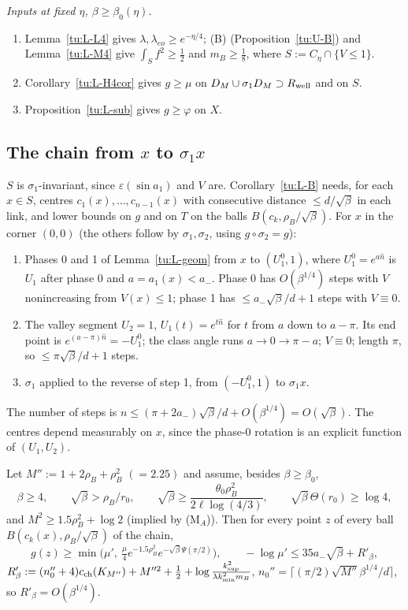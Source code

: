 \noindent\emph{Inputs at fixed $\eta$, $\beta\ge\beta_0(\eta)$.}
\begin{enumerate}
\item Lemma~\ref{tu:L-L4} gives $\lambda,\lambda_{eo}\ge e^{-\eta/4}$; (B) (Proposition~\ref{tu:U-B}) and Lemma~\ref{tu:L-M4} give
$\int_Sf^2\ge\frac12$ and $m_B\ge\frac18$, where $S:=C_\eta\cap\{V\le1\}$.
\item Corollary~\ref{tu:L-H4cor} gives $g\ge\mu$ on $D_M\cup\sigma_1D_M\supset R_{\rm well}$ and on $S$.
\item Proposition~\ref{tu:L-sub} gives $g\ge\varphi$ on $X$.
\end{enumerate}

\subsection{The chain from $x$ to $\sigma_1x$}\label{tu:L-chainsec}
$S$ is $\sigma_1$-invariant, since $\varepsilon(\sin a_1)$ and $V$ are. Corollary~\ref{tu:L-B} needs, for each $x\in S$, centres
$c_1(x),\dots,c_{n-1}(x)$ with consecutive distance $\le d/\sqrt\beta$ in each link, and lower bounds on $g$ and on $T$ on the
balls $B(c_k,\rho_B/\sqrt\beta)$. For $x$ in the corner $(0,0)$ (the others follow by $\sigma_1,\sigma_2$, using $g\circ\sigma_2=g$):
\begin{enumerate}
\item Phases 0 and 1 of Lemma~\ref{tu:L-geom} from $x$ to $(U_1^0,1)$, where $U_1^0=e^{a\hat n}$ is $U_1$ after phase 0 and
$a=a_1(x)<a_-$. Phase 0 has $O(\beta^{1/4})$ steps with $V$ nonincreasing from $V(x)\le1$; phase 1 has $\le a_-\sqrt\beta/d+1$ steps with $V\equiv0$.
\item The valley segment $U_2=1$, $U_1(t)=e^{t\hat n}$ for $t$ from $a$ down to $a-\pi$. Its end point is $e^{(a-\pi)\hat n}=-U_1^0$; the
class angle runs $a\to0\to\pi-a$; $V\equiv0$; length $\pi$, so $\le\pi\sqrt\beta/d+1$ steps.
\item $\sigma_1$ applied to the reverse of step 1, from $(-U_1^0,1)$ to $\sigma_1x$.
\end{enumerate}
The number of steps is $n\le(\pi+2a_-)\sqrt\beta/d+O(\beta^{1/4})=O(\sqrt\beta)$. The centres depend measurably on $x$, since the
phase-0 rotation is an explicit function of $(U_1,U_2)$.

\begin{lemma}\label{tu:L-balls}
Let $M'':=1+2\rho_B+\rho_B^2$ $(=2.25)$ and assume, besides $\beta\ge\beta_0$,
\[
\beta\ge4,\qquad \sqrt\beta>\rho_B/r_0,\qquad \sqrt\beta\ge\frac{\theta_0\rho_B^2}{2\ell\log(4/3)},\qquad\sqrt\beta\,\Theta(r_0)\ge\log4 ,
\]
and $M^2\ge1.5\rho_B^2+\log2$ (implied by (M$_A$)). Then for every point $z$ of every ball $B(c_k(x),\rho_B/\sqrt\beta)$ of the chain,
\[
g(z)\ge\min\big(\mu',\ \tfrac\mu4e^{-1.5\rho_B^2}e^{-\sqrt\beta\Psi(\pi/2)}\big),\qquad
-\log\mu'\le35a_-\sqrt\beta+R'_\beta,
\]
$R'_\beta:=(n_0''+4)c_{\rm ch}(K_{M''})+M''^2+\tfrac12+\log\frac{k_{\sup}^2}{\lambda k_{\min}^2m_B}$, $n_0''=\lceil(\pi/2)\sqrt{M''}\beta^{1/4}/d\rceil$,
so $R'_\beta=O(\beta^{1/4})$.
\end{lemma}

